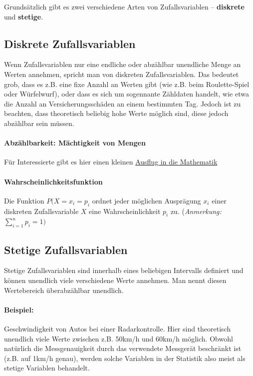 \documentclass[a4paper]{article}
\begin{document}
\noindent Grundsätzlich gibt es zwei verschiedene Arten von Zufallsvariablen -- \textbf{diskrete} und \textbf{stetige}. 

\subsection{Diskrete Zufallsvariablen} \label{sec:dzv}
Wenn Zufallsvariablen nur eine endliche oder abzählbar unendliche Menge an Werten annehmen, spricht man von diskreten Zufallsvariablen. Das bedeutet grob, dass es z.B. eine fixe Anzahl an Werten gibt (wie z.B. beim Roulette-Spiel oder Würfelwurf), oder dass es sich um sogennante Zähldaten handelt, wie etwa die Anzahl an Versicherungsschäden an einem bestimmten Tag. Jedoch ist zu beachten, dass theoretisch beliebig hohe Werte möglich sind, diese jedoch abzählbar sein müssen. 

\paragraph{Abzählbarkeit: Mächtigkeit von Mengen} Für Interessierte gibt es hier einen kleinen  \href{https://de.wikibooks.org/wiki/Mathe_f\%C3\%BCr_Nicht-Freaks:_M\%C3\%A4chtigkeit_von_Mengen}{Ausflug in die Mathematik}

\paragraph{Wahrscheinlichkeitsfunktion} Die Funktion $P(X = x_i= p_i$ ordnet jeder möglichen Ausprägung $x_i$ einer diskreten Zufallsvariable $X$ eine Wahrscheinlichkeit $p_i$ zu. (\textit{Anmerkung:} $\sum_{i=1}^n p_i = 1)$

\subsection{Stetige Zufallsvariablen} \label{sec:szv}
Stetige Zufallsvariablen sind innerhalb eines beliebigen Intervalls definiert und können unendlich viele verschiedene Werte annehmen. Man nennt diesen Wertebereich überabzählbar unendlich.

\paragraph{Beispiel:} Geschwindigkeit von Autos bei einer Radarkontrolle. Hier sind theoretisch unendlich viele Werte zwischen z.B. 50km/h und 60km/h möglich. Obwohl natürlich die Messgenauigkeit durch das verwendete Messgerät beschränkt ist (z.B. auf 1km/h genau), werden solche Variablen in der Statistik also meist als stetige Variablen behandelt.
\end{document}
